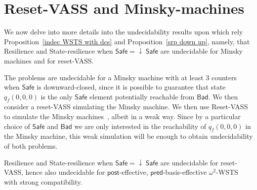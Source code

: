 \documentclass[runningheads]{llncs}
\newcommand{\pred}{\textsf{pred}}
\newcommand{\post}{\textsf{post}}
\newcommand{\Bad}{\textsf{Bad}}
\newcommand{\Safe}{\textsf{Safe}}
\begin{document}
\section{Reset-VASS and Minsky-machines}\label{minsk}


We now delve into more details into the undecidability results 
upon which rely
Proposition~\ref{indec WSTS with dcs}
and
Proposition~\ref{srp down up},
namely, that
{\sc Resilience} and {\sc State-resilience} when $\Safe = \mathop{\downarrow}~\Safe$
are undecidable for Minsky machines
and 
for reset-VASS.

The problems are undecidable for a Minsky machine with at least $3$ counters when
$\Safe$ is downward-closed, since it is possible to guarantee that state $q_f(0,0,0)$ is the only $\Safe$ element potentially reachable from $\Bad$. We then consider a reset-VASS simulating the Minsky machine. We then use Reset-VASS to simulate the Minsky machines~\cite{araki1976PN,dufourd1998reset}, albeit in a weak way. 
Since by a particular choice of $\Safe$ and $\Bad$ we are only interested in the reachability of $q_f(0,0,0)$ in the Minsky machine, 
this weak simulation will be enough to obtain undecidability of both problems.


\begin{proposition}\label{both minsk indec}
{\sc Resilience} and {\sc State-resilience} when $\Safe = \mathop{\downarrow}~\Safe$ are undecidable for reset-VASS, hence also undecidable for $\post$-effective, $\pred$-basis-effective $\omega^2$-WSTS with strong compatibility.
\end{proposition}
\end{document}
